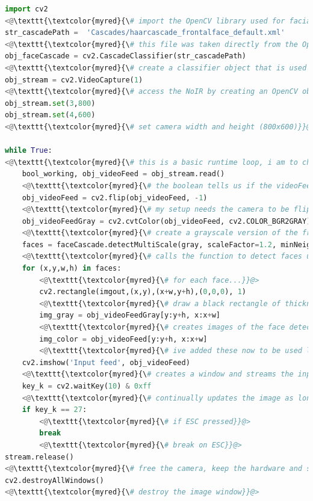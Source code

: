 \documentclass[9pt]{article}
\begin{document}
\begin{lstlisting}[language=Python]
import cv2 
<@\texttt{\textcolor{myred}{\# import the OpenCV library used for facial recognition into our code, we can then call all functions in this library}}@>
str_cascadePath =  'Cascades/haarcascade_frontalface_default.xml'
<@\texttt{\textcolor{myred}{\# this file was taken directly from the OpenCV GitHub repo}}@>
obj_faceCascade = cv2.CascadeClassifier(str_cascadePath)
<@\texttt{\textcolor{myred}{\# create a classifier object that is used to identify faces using the cascade that str\_cascadePath points to}}@> 
obj_stream = cv2.VideoCapture(1)
<@\texttt{\textcolor{myred}{\# access the NoIR by creating an OpenCV object that uses the camera}}@> 
obj_stream.set(3,800) 
obj_stream.set(4,600)
<@\texttt{\textcolor{myred}{\# set camera width and height (800x600)}}@>

while True:
<@\texttt{\textcolor{myred}{\# this is a basic runtime loop, i am to change this when i add the web interface to call this as a function}}@> 
	bool_working, obj_videoFeed = obj_stream.read() 
	<@\texttt{\textcolor{myred}{\# the boolean tells us if the videoFeed could be read correctly, and the other variable contains images from the camera}}@> 
	obj_videoFeed = cv2.flip(obj_videoFeed, -1)
	<@\texttt{\textcolor{myred}{\# my setup needs the camera to be flipped due to its placement}}@> 
	obj_videoFeedGray = cv2.cvtColor(obj_videoFeed, cv2.COLOR_BGR2GRAY)
	<@\texttt{\textcolor{myred}{\# create a grayscale version of the frames captured using the OpenCV conversion}}@> 
	faces = faceCascade.detectMultiScale(gray, scaleFactor=1.2, minNeighbors=5, minSize=(30, 30))
	<@\texttt{\textcolor{myred}{\# calls the function to detect faces using the Haar Cascade, applied to the gray image}}@> 
	for (x,y,w,h) in faces:
		<@\texttt{\textcolor{myred}{\# for each face...}}@> 
		cv2.rectangle(imgout,(x,y),(x+w,y+h),(0,0,0), 1) 
		<@\texttt{\textcolor{myred}{\# draw a black rectangle of thickness 1 as a bounding box around the face}}@>
		img_gray = obj_videoFeedGray[y:y+h, x:x+w]
		<@\texttt{\textcolor{myred}{\# creates images of the face detected in greyscale and in color}}@> 
		img_color = obj_videoFeed[y:y+h, x:x+w]
		<@\texttt{\textcolor{myred}{\# ive added these now to be used later when saving photos of unknown people, just for testing at the moment}}@> 
	cv2.imshow('Input feed', obj_videoFeed) 
	<@\texttt{\textcolor{myred}{\# creates a window and streams the input from the camera from the variable imgout}}@>
	key_k = cv2.waitKey(10) & 0xff
	<@\texttt{\textcolor{myred}{\# continually updates the image as long as ESC isnt pressed}}@> 
	if key_k == 27:
		<@\texttt{\textcolor{myred}{\# if ESC pressed}}@>
		break
		<@\texttt{\textcolor{myred}{\# break on ESC}}@> 
stream.release()
<@\texttt{\textcolor{myred}{\# free the camera, keep the hardware and software (mainly memory) tidy, this prevents errors with the camera being in-use whilst we try to run the code}}@> 
cv2.destroyAllWindows()
<@\texttt{\textcolor{myred}{\# destroy the image window}}@> 

\end{lstlisting}
\end{document}
